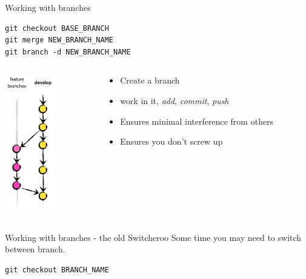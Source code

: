 \documentclass[table,svgnames,aspectratio=169]{beamer}
\begin{document}
\begin{frame}[fragile,label={sec:org487211f}]{Working with branches}
 \lstset{language=bash,label= ,caption= ,captionpos=b,numbers=none}
\begin{lstlisting}
git checkout BASE_BRANCH
git merge NEW_BRANCH_NAME 
git branch -d NEW_BRANCH_NAME 
\end{lstlisting}

\begin{columns}
\begin{column}{.5\columnwidth}
\begin{center}
\includegraphics[height=6cm]{graphics/fb2x.png}
\end{center}
\end{column}

\begin{column}{.5\columnwidth}
\begin{itemize}
\item Create a branch
\item work in it, \emph{add}, \emph{commit}, \emph{push}
\item Ensures minimal interference from others
\item Ensures you don't screw up
\end{itemize}
\end{column}
\end{columns}
\end{frame}


\begin{frame}[fragile,label={sec:org8a68cb7}]{Working with branches - the old Switcheroo}
 Some time you may need to switch between branch. 

\lstset{language=bash,label= ,caption= ,captionpos=b,numbers=none}
\begin{lstlisting}
git checkout BRANCH_NAME
\end{lstlisting}
\end{frame}
\end{document}
